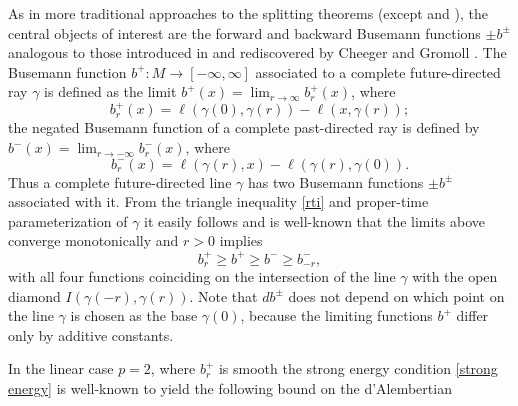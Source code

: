 \documentclass[12pt]{amsart}
\begin{document}
As in more traditional approaches to the splitting theorems (except \cite{Galloway84} and \cite{Bartnik88}), the central objects of interest are the forward and backward Busemann functions $\pm b^\pm$ analogous to those introduced in \cite{Busemann32} and rediscovered by Cheeger and Gromoll \cite{CheegerGromoll71}.  The Busemann function 
$b^+:M \longrightarrow [-\infty,\infty]$ associated to a 
complete future-directed ray $\gamma$ is defined as the limit $b^+(x)=\lim_{r\to \infty} b^+_r(x)$,  where
\begin{equation}\label{b^+_r}
b^+_r(x) = \ell(\gamma(0),\gamma(r))-\ell(x,\gamma(r)); %
\end{equation}
the negated Busemann function of a complete past-directed ray is defined by $b^-(x) = \lim_{r\to-\infty}b^-_r(x)$, where
\begin{equation}\label{b^-_r}
b^-_r(x) = \ell(\gamma(r),x)-\ell(\gamma(r), \gamma(0)).
\end{equation}
Thus a complete future-directed line $\gamma$ has two Busemann functions $\pm b^\pm$ associated with it.  From the triangle inequality \eqref{rti} and proper-time parameterization of $\gamma$ it easily follows and is well-known that the limits above converge monotonically and $r>0$ implies
\begin{equation}\label{ordering}
b^+_r \ge b^+ \ge b^- \ge b^-_{-r},
\end{equation}
with all four functions coinciding on the intersection of the line $\gamma$ with the open diamond $I(\gamma(-r),\gamma(r))$.
Note that $db^\pm$ does not depend on which point on the line $\gamma$ is chosen as the base $\gamma(0)$,
because the limiting functions $b^+$ differ only by additive constants.

In the linear case $p=2$, where $b^+_r$ is smooth the strong energy condition \eqref{strong energy}
is well-known to yield the following bound \cite[\S 5]{Eschenburg88} on the d'Alembertian
\end{document}
